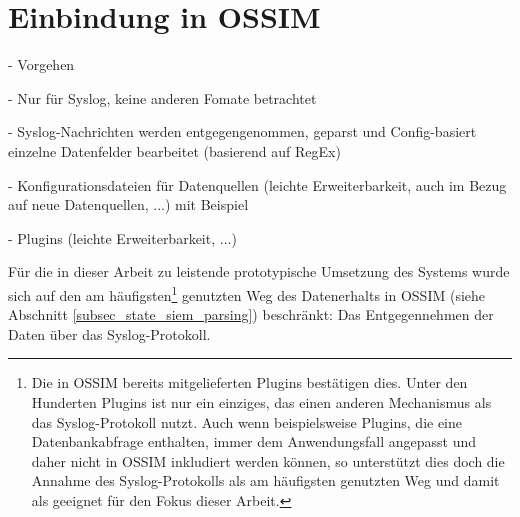 \section{Einbindung in OSSIM}

\label{sec_impl_integration_into_ossim}

- Vorgehen

- Nur für Syslog, keine anderen Fomate betrachtet

- Syslog-Nachrichten werden entgegengenommen, geparst und Config-basiert einzelne Datenfelder bearbeitet (basierend auf RegEx)

- Konfigurationsdateien für Datenquellen (leichte Erweiterbarkeit, auch im Bezug auf neue Datenquellen, ...) mit Beispiel

- Plugins (leichte Erweiterbarkeit, ...)




Für die in dieser Arbeit zu leistende prototypische Umsetzung des Systems wurde sich auf den am häufigsten\footnote{
  Die in OSSIM bereits mitgelieferten Plugins bestätigen dies. Unter den Hunderten Plugins ist nur ein einziges, das einen anderen Mechanismus als das Syslog-Protokoll nutzt. Auch wenn beispielsweise Plugins, die eine Datenbankabfrage enthalten, immer dem Anwendungsfall angepasst und daher nicht in OSSIM inkludiert werden können, so unterstützt dies doch die Annahme des Syslog-Protokolls als am häufigsten genutzten Weg und damit als geeignet für den Fokus dieser Arbeit.
} genutzten Weg des Datenerhalts in OSSIM (siehe Abschnitt \ref{subsec_state_siem_parsing}) beschränkt: Das Entgegennehmen der Daten über das Syslog-Protokoll. 